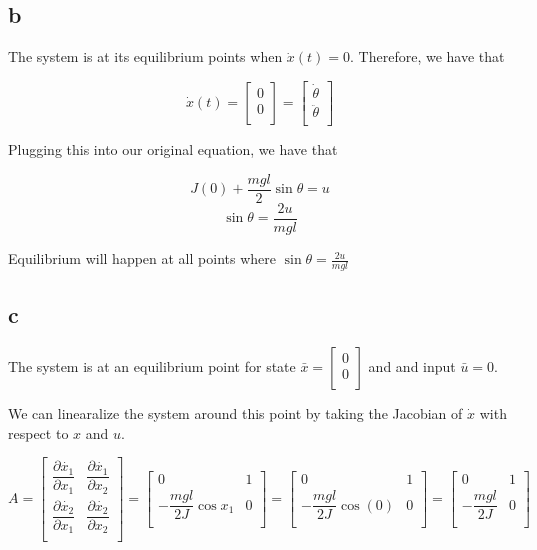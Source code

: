 \documentclass[11pt]{article}
\begin{document}
\subsection{b}

The system is at its equilibrium points when $\dot{x}(t) = 0$. Therefore, we have that 

\[
\dot{x}(t) = 
\begin{bmatrix}
    0 \\
    0 \\
\end{bmatrix}
=
\begin{bmatrix}
    \dot{\theta} \\
    \ddot{\theta} \\
\end{bmatrix}
\]

Plugging this into our original equation, we have that

\[ J (0) + \dfrac{mgl}{2} \sin \theta = u \]
\[\sin\theta = \dfrac{2u}{mgl} \]

Equilibrium will happen at all points where $\sin \theta = \frac{2u}{mgl}$

\subsection{c}

The system is at an equilibrium point for state $\bar{x} = \begin{bmatrix} 0 \\ 0 \\ \end{bmatrix}$ and and input $\bar{u} = 0$.

We can linearalize the system around this point by taking the Jacobian of $\dot{x}$ with respect to $x$ and $u$.

\[
    A = 
    \begin{bmatrix}
        \dfrac{\partial \dot{x_1}}{\partial x_1} & \dfrac{\partial \dot{x_1}}{\partial x_2} \\
        \dfrac{\partial \dot{x_2}}{\partial x_1} & \dfrac{\partial \dot{x_2}}{\partial x_2} \\
    \end{bmatrix}
    = \begin{bmatrix}
        0 & 1 \\
        - \dfrac{mgl}{2J} \cos x_1 & 0 \\
    \end{bmatrix}
    = \begin{bmatrix}
        0 & 1 \\
        - \dfrac{mgl}{2J} \cos (0) & 0 \\
    \end{bmatrix}
    = \begin{bmatrix}
        0 & 1 \\
        - \dfrac{mgl}{2J} & 0 \\
    \end{bmatrix}
\]
\end{document}
